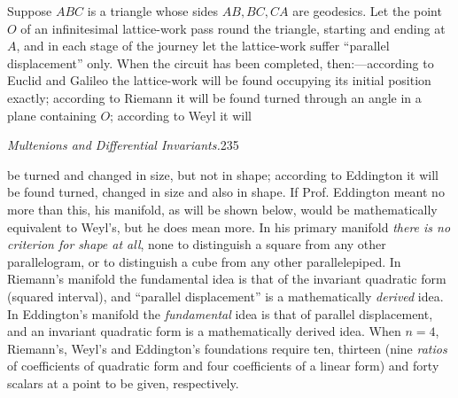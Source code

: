 \documentclass[11pt]{article}
\begin{document}
\indent Suppose $ABC$ is a triangle whose sides $AB,BC,CA$ are geodesics. Let the point $O$ of an infinitesimal lattice-work pass round the triangle, starting and ending at $A$, and in each stage of the journey let the lattice-work suffer ``parallel displacement'' only. When the circuit has been completed, then:---according to Euclid and Galileo the lattice-work will be found occupying its initial position exactly; according to Riemann it will be found turned through an angle in a plane containing $O$; according to Weyl it will
\newpage\thispagestyle{empty}\begin{center}\textit{Multenions and Differential Invariants.}\hfill 235\end{center}
be turned and changed in size, but not in shape; according to Eddington it will be found turned, changed in size and also in shape. If Prof. Eddington meant no more than this, his manifold, as will be shown below, would be mathematically equivalent to Weyl's, but he does mean more. In his primary manifold \emph{there is no criterion for shape at all}, none to distinguish a square from any other parallelogram, or to distinguish a cube from any other parallelepiped. In Riemann's manifold the fundamental idea is that of the invariant quadratic form (squared interval), and ``parallel displacement'' is a mathematically \emph{derived} idea. In Eddington's manifold the \emph{fundamental} idea is that of parallel displacement, and an invariant quadratic form is a mathematically derived idea. When $n=4$, Riemann's, Weyl's and Eddington's foundations require ten, thirteen (nine \emph{ratios} of coefficients of quadratic form and four coefficients of a linear form) and forty scalars at a point to be given, respectively.
\end{document}

